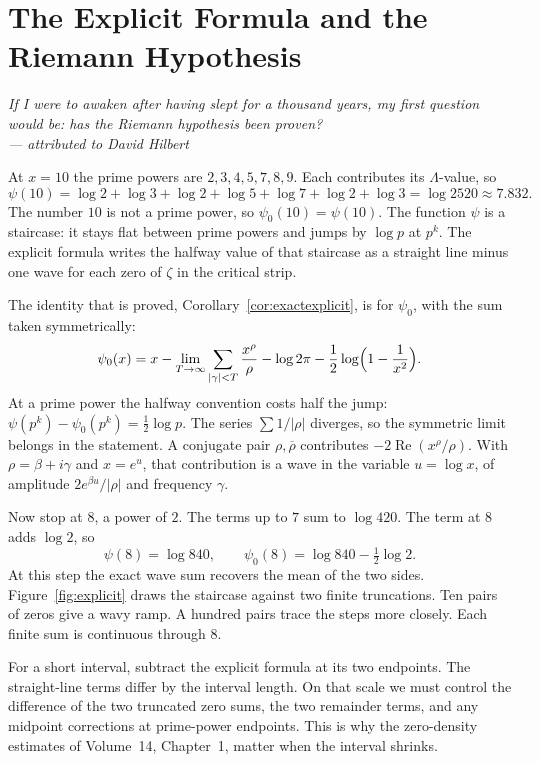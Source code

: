 \chapter{The Explicit Formula and the Riemann Hypothesis}\label{ch:explicit}

\begin{center}\itshape
If I were to awaken after having slept for a thousand years, my first question would be: has the Riemann hypothesis been proven?\\
\upshape --- attributed to David Hilbert
\end{center}

At $x=10$ the prime powers are $2,3,4,5,7,8,9$. Each contributes its $\Lambda$-value, so
\[
\psi(10)=\log2+\log3+\log2+\log5+\log7+\log2+\log3=\log2520\approx7.832.
\]
The number $10$ is not a prime power, so $\psi_0(10)=\psi(10)$. The function $\psi$ is a staircase: it stays flat between prime powers and jumps by $\log p$ at $p^k$. The explicit formula writes the halfway value of that staircase as a straight line minus one wave for each zero of $\zeta$ in the critical strip.

The identity that is proved, Corollary~\ref{cor:exactexplicit}, is for $\psi_0$, with the sum taken symmetrically:
\[
\psi_0(x)=x-\lim_{T\to\infty}\sum_{|\gamma|<T}\frac{x^\rho}\rho-\log2\pi-\frac12\log\Bigl(1-\frac1{x^2}\Bigr).
\]
At a prime power the halfway convention costs half the jump: $\psi(p^k)-\psi_0(p^k)=\frac12\log p$. The series $\sum 1/|\rho|$ diverges, so the symmetric limit belongs in the statement. A conjugate pair $\rho,\overline\rho$ contributes $-2\operatorname{Re}(x^\rho/\rho)$. With $\rho=\beta+i\gamma$ and $x=e^u$, that contribution is a wave in the variable $u=\log x$, of amplitude $2e^{\beta u}/|\rho|$ and frequency $\gamma$.

Now stop at $8$, a power of $2$. The terms up to $7$ sum to $\log420$. The term at $8$ adds $\log2$, so
\[
\psi(8)=\log840,\qquad \psi_0(8)=\log840-\tfrac12\log2.
\]
At this step the exact wave sum recovers the mean of the two sides. Figure~\ref{fig:explicit} draws the staircase against two finite truncations. Ten pairs of zeros give a wavy ramp. A hundred pairs trace the steps more closely. Each finite sum is continuous through $8$.

For a short interval, subtract the explicit formula at its two endpoints. The straight-line terms differ by the interval length. On that scale we must control the difference of the two truncated zero sums, the two remainder terms, and any midpoint corrections at prime-power endpoints. This is why the zero-density estimates of Volume~14, Chapter~1, matter when the interval shrinks.

